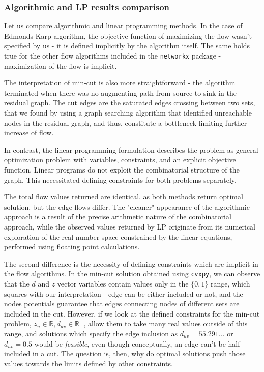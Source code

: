 \documentclass[12pt, openany]{article}
\begin{document}
\subsubsection{Algorithmic and LP results comparison}

Let us compare algorithmic and linear programming methods. In the case of Edmonds-Karp algorithm, the objective function of maximizing the flow wasn't specified by us - it is defined implicitly by the algorithm itself. The same holds true for the other flow algorithms included in the \texttt{networkx} package - maximization of the flow is implicit.

The interpretation of min-cut is also more straightforward - the algorithm terminated when there was no augmenting path from source to sink in the residual graph. The cut edges are the saturated edges crossing between two sets, that we found by using a graph searching algorithm that identified unreachable nodes in the residual graph, and thus, constitute a bottleneck limiting further increase of flow.

In contrast, the linear programming formulation describes the problem as general optimization problem with variables, constraints, and an explicit objective function. Linear programs do not exploit the combinatorial structure of the graph. This necessitated defining constraints for both problems separately.

The total flow values returned are identical, as both methods return optimal solution, but the edge flows differ. The "cleaner" appearance of the algorithmic approach is a result of the precise arithmetic nature of the combinatorial approach, while the observed values returned by LP originate from its numerical exploration of the real number space constrained by the linear equations, performed using floating point calculations.

The second difference is the necessity of defining constraints which are implicit in the flow algorithms. In the min-cut solution obtained using \texttt{cvxpy}, we can observe that the \(d\) and \(z\) vector variables contain values only in the \(\{0, 1\}\) range, which squares with our interpretation - edge can be either included or not, and the nodes potentials guarantee that edges connecting nodes of different sets are included in the cut. However, if we look at the defined constraints for the min-cut problem, \(z_u \in \mathbb{R}, d_{uv} \in \mathbb{R^+}\), allow them to take many real values outside of this range, and solutions which specify the edge inclusion as \(d_{uv} = 55.291...\) or \(d_{uv} = 0.5\) would be \textit{feasible}, even though conceptually, an edge can't be half-included in a cut. The question is, then, why do optimal solutions push those values towards the limits defined by other constraints.
\end{document}
